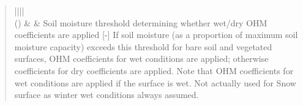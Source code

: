 \documentclass[letterpaper,10pt,english]{sphinxmanual}
\begin{document}
\begin{fulllineitems}
\begin{quote}
\begin{description}
\begin{savenotes}
\begin{tabular}[t]{||||}
\\
\hline
{\hyperref[\detokenize{input_files/SUEWS_SiteInfo/SUEWS_Snow:suews-snow-txt}]{}} ()
&
{\hyperref[\detokenize{notation:term-md}]{}}
&
Soil moisture threshold determining whether wet/dry OHM coefficients are applied {[}-{]} If soil moisture (as a proportion of maximum soil moisture capacity) exceeds this threshold for bare soil and vegetated surfaces, OHM coefficients for wet conditions are applied; otherwise coefficients for dry coefficients are applied. Note that OHM coefficients for wet conditions are applied if the surface is wet. Not actually used for Snow surface as winter wet conditions always assumed.
\\
\hline
\end{tabular}
\par
\sphinxattableend\end{savenotes}

\end{description}\end{quote}

\end{fulllineitems}

\end{document}
